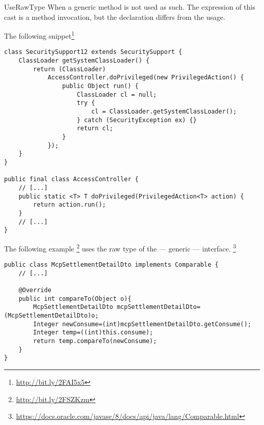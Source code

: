 \begin{pattern}{UseRawType}
When a generic method is not used as such.
The expression of this cast is a method invocation,
but the declaration differs from the usage.

\instances{}
The following snippet\footnote{\url{http://bit.ly/2FAI5x5}}


\begin{verbatim}
class SecuritySupport12 extends SecuritySupport {
    ClassLoader getSystemClassLoader() {
        return (ClassLoader)
            AccessController.doPrivileged(new PrivilegedAction() {
                public Object run() {
                    ClassLoader cl = null;
                    try {
                        cl = ClassLoader.getSystemClassLoader();
                    } catch (SecurityException ex) {}
                    return cl;
                }
            });
    }
}

public final class AccessController {
    // [...]
    public static <T> T doPrivileged(PrivilegedAction<T> action) {
        return action.run();
    }
    // [...]
}
\end{verbatim}

The following example%
\footnote{\url{http://bit.ly/2FSZKzm}}
uses the raw type of the  --- generic --- interface.%
\footnote{\url{https://docs.oracle.com/javase/8/docs/api/java/lang/Comparable.html}}

\begin{verbatim}
public class McpSettlementDetailDto implements Comparable {
    // [...]

    @Override
    public int compareTo(Object o){
        McpSettlementDetailDto mcpSettlementDetailDto=(McpSettlementDetailDto)o;
        Integer newConsume=(int)mcpSettlementDetailDto.getConsume();
        Integer temp=((int)this.consume);
        return temp.compareTo(newConsume);
    }
}
\end{verbatim}




\detection{}

\discussion{}

\related{}

\end{pattern}